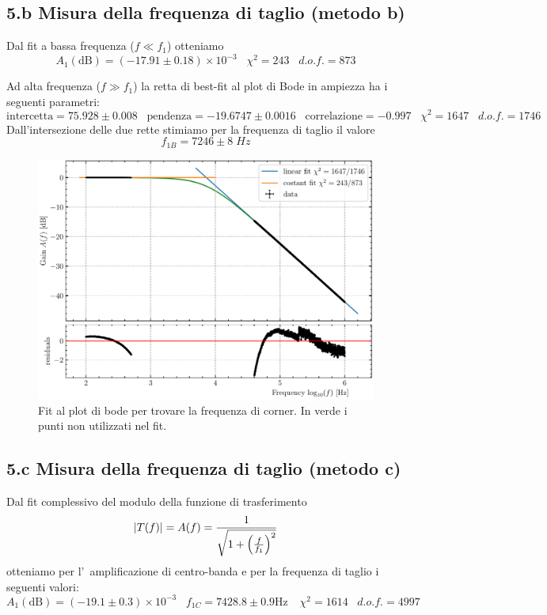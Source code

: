 \documentclass[10pt, a4paper, italian]{article}
\begin{document}
\subsection*{5.b Misura della frequenza di taglio (metodo b)}
Dal fit a bassa frequenza ($f\ll f_1$) otteniamo
\[
A_1(\mathrm{dB}) = \left(-17.91 \pm 0.18\right)\times 10^{-3} \;\;\;
\chi^2 = 243 \;\;\; d.o.f. = 873
\]

Ad alta frequenza ($f \gg f_1$) la retta di best-fit al plot di Bode in 
ampiezza ha i seguenti parametri:
\[
\mathrm{intercetta} = 75.928 \pm 0.008 \;\;\;\mathrm{pendenza} = -19.6747 \pm 
0.0016 \;\;\;\mathrm{correlazione} 
= -0.997 \;\;\; \chi^2 = 1647 \;\;\; d.o.f. = 1746
\]
Dall'intersezione delle due rette stimiamo per la frequenza di taglio il valore
\[
f_{1B} = 7246 \pm 8 \; \si{Hz}
\]

\begin{figure}[htbp]
\centering
\includegraphics[scale=0.7]{corner}
\caption{Fit al plot di bode per trovare la frequenza di corner. In verde i
punti non utilizzati nel fit. \label{fig: corner}}
\end{figure}

\subsection*{5.c Misura della frequenza di taglio (metodo c)}
Dal fit complessivo del modulo della funzione di trasferimento
\begin{equation}\label{eq: lpfgain}
\left| T(f) \right| = A(f) = \frac{1}{\sqrt{1 + \left(\frac{f}{f_1}\right)^2}}
\end{equation}
otteniamo per l'~amplificazione di centro-banda e per la frequenza di taglio i 
seguenti valori:
\[
A_1 (\mathrm{dB}) = \left(-19.1 \pm 0.3\right)\times 10^{-3} \;\;\;
f_{1C} = 7428.8 \pm 0.9 \si{\Hz} \;\;\;\ \chi^2 = 1614 \;\;\; d.o.f.= 4997
\]
\end{document}
